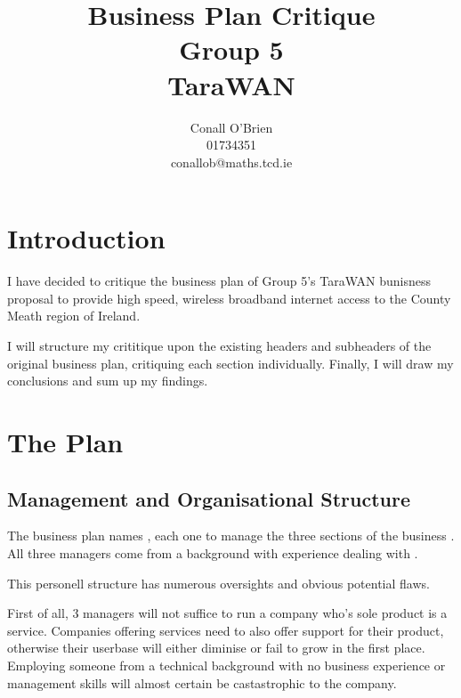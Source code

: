 \documentclass[a4paper,12pt]{article}
\begin{document}
\title{Business Plan Critique \\ Group 5 \\ TaraWAN}

\vspace{20mm}

\author{Conall O'Brien \\ 01734351 \\ conallob@maths.tcd.ie}

\maketitle

\newpage

\tableofcontents

\section{Introduction}

I have decided to critique the business plan of Group 5's TaraWAN
bunisness proposal to provide high speed, wireless broadband internet
access to the County Meath region of Ireland.


I will structure my crititique upon the existing headers and subheaders
of the original business plan, critiquing each section individually.
Finally, I will draw my conclusions and sum up my findings.

\section{The Plan}

\subsection{Management and Organisational Structure}

The business plan names \cite[3 employees]{busplan}, each one to manage
the three sections of the business \cite[Sales and Marketing,
Procurement and Technology Development]{busplan}. All three managers
come from a \cite[Computer Science]{busplan} background with experience
dealing with \cite[large scale wireless networks]{busplan}.

This personell structure has numerous oversights and obvious potential
flaws. 


First of all, 3 managers will not suffice to run a company who's
sole product is a service. Companies offering services need to also
offer support for their product, otherwise their userbase will either
diminise or fail to grow in the first place. Employing someone from a 
technical background with no business experience or management skills 
will almost certain be castastrophic to the company.
\end{document}
